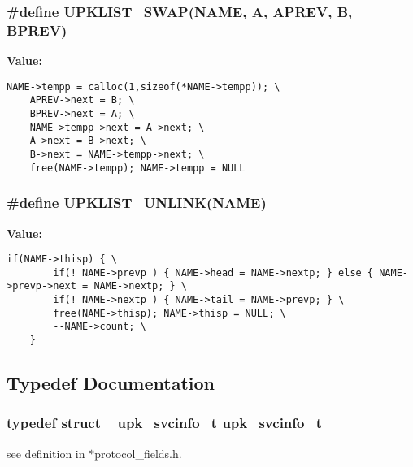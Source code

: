 \subsubsection{\setlength{\rightskip}{0pt plus 5cm}\#define UPKLIST\_\-SWAP(NAME, A, APREV, B, BPREV)}\label{types_8h_2ea4c2099d4931068b49bd96513c579e}


\textbf{Value:}

\begin{Code}\begin{verbatim}NAME->tempp = calloc(1,sizeof(*NAME->tempp)); \
    APREV->next = B; \
    BPREV->next = A; \
    NAME->tempp->next = A->next; \
    A->next = B->next; \
    B->next = NAME->tempp->next; \
    free(NAME->tempp); NAME->tempp = NULL
\end{verbatim}\end{Code}
\subsubsection{\setlength{\rightskip}{0pt plus 5cm}\#define UPKLIST\_\-UNLINK(NAME)}\label{types_8h_5d93b1c891a70dee619dffb6e4978970}


\textbf{Value:}

\begin{Code}\begin{verbatim}if(NAME->thisp) { \
        if(! NAME->prevp ) { NAME->head = NAME->nextp; } else { NAME->prevp->next = NAME->nextp; } \
        if(! NAME->nextp ) { NAME->tail = NAME->prevp; } \
        free(NAME->thisp); NAME->thisp = NULL; \
        --NAME->count; \
    }
\end{verbatim}\end{Code}


\subsection{Typedef Documentation}
\subsubsection{\setlength{\rightskip}{0pt plus 5cm}typedef struct \bf{\_\-upk\_\-svcinfo\_\-t}  \bf{upk\_\-svcinfo\_\-t}}\label{types_8h_9bb531700dcda23e129ddb57b794169c}


see definition in $\ast$protocol\_\-fields.h. 

